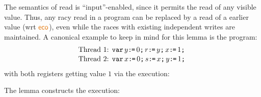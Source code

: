 The semantics of read is ``input''-enabled, since it permits the read of any visible value.   Thus, any racy read in a program can be replaced by a read of a earlier value (wrt $\reco$), even while  the races with existing independent writes are maintained.   A canonical example to keep in mind for this lemma is the program:
\begin{align*}
\mbox{Thread 1: } &\texttt{var}\, y\texttt{:}\mkern-1mu\texttt{=}\, 0 \texttt{;}\, r \texttt{:}\mkern-1mu\texttt{=}\, y  \texttt{;}\, x \texttt{:}\mkern-1mu\texttt{=}\, 1  \texttt{;}\, \\[-.5ex]
\mbox{Thread 2: } &\texttt{var}\, x\texttt{:}\mkern-1mu\texttt{=}\, 0 \texttt{;}\, s \texttt{:}\mkern-1mu\texttt{=}\, x \texttt{;}\, y \texttt{:}\mkern-1mu\texttt{=}\, 1  \texttt{;}\, 
\end{align*}
with both registers getting value $1$ via the execution:
\begin{tikzdisplay}[node distance=1em]
\end{tikzdisplay}
The lemma constructs the execution:
\begin{tikzdisplay}[node distance=1em]
\end{tikzdisplay}


